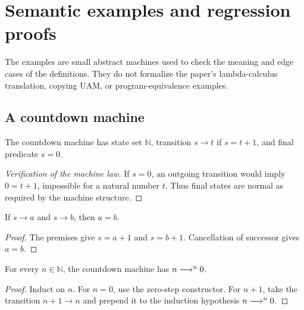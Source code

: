 \section{Semantic examples and regression proofs}

The examples are small abstract machines used to check the meaning and
edge cases of the definitions. They do not formalize the paper's
lambda-calculus translation, copying UAM, or program-equivalence examples.

\subsection{A countdown machine}

\begin{definition}[Countdown]
The countdown machine has state set $\mathbb N$, transition
$s\to t$ if $s=t+1$, and final predicate $s=0$.
\end{definition}
\begin{proof}[Verification of the machine law]
If $s=0$, an outgoing transition would imply $0=t+1$, impossible for
a natural number $t$. Thus final states are normal as required by
the machine structure.
\end{proof}

\begin{lemma}
If $s\to a$ and $s\to b$, then $a=b$.
\end{lemma}
\begin{proof}
The premises give $s=a+1$ and $s=b+1$. Cancellation of successor
gives $a=b$.
\end{proof}

\begin{lemma}
For every $n\in\mathbb N$, the countdown machine has
$n\mathrel{\longrightarrow^{n}}0$.
\end{lemma}
\begin{proof}
Induct on $n$. For $n=0$, use the zero-step constructor. For $n+1$,
take the transition $n+1\to n$ and prepend it to the induction
hypothesis $n\mathrel{\longrightarrow^{n}}0$.
\end{proof}

